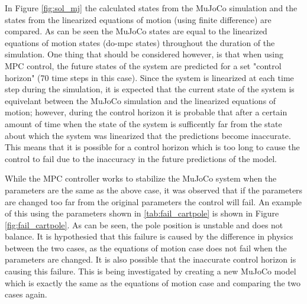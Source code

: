 \documentclass{./springer/svjour3}
\begin{document}
In Figure \ref{fig:sol_mj} the calculated states from the MuJoCo simulation and the states from the linearized equations of motion (using 
finite difference) are compared. As can be seen the MuJoCo states are equal to the linearized equations of motion states (do-mpc states) throughout the duration 
of the simulation. One thing that should be considered however, is that when using MPC control, the future states of the system are predicted for a set 
"control horizon" (70 time steps in this case). Since the system is linearized at each time step during the simulation, it is expected that the current state of the 
system is equivelant between the MuJoCo simulation and the linearized equations of motion; however, during the control horizon it is probable that after a certain amount of time 
when the state of the system is sufficently far from the state about which the system was linearized that the predictions become inaccurate. This means that it is possible 
for a control horizon which is too long to cause the control to fail due to the inaccuracy in the future predictions of the model.

While the MPC controller works to stabilize the MuJoCo system when the parameters are the same as the above case, it was observed 
that if the parameters are changed too far from the original parameters the control will fail. An example of this using the parameters shown in 
\ref{tab:fail_cartpole} is shown in Figure \ref{fig:fail_cartpole}. As can be seen, the pole position is unstable and does not balance. It is hypothesied that 
this failure is caused by the difference in physics between the two cases, as the equations of motion case does not fail when the parameters are changed. It is also possible 
that the inaccurate control horizon is causing this failure. This is being investigated by creating a new MuJoCo model which is exactly the same as the equations of motion case 
and comparing the two cases again.
\end{document}
